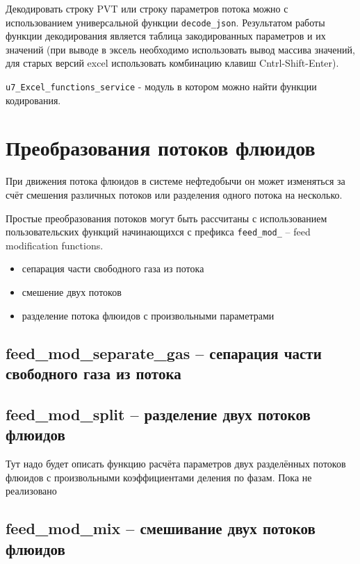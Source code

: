 Декодировать строку PVT или строку параметров потока можно с использованием универсальной функции  \texttt{decode_json}. Результатом работы функции декодирования является таблица закодированных параметров и их значений (при выводе в эксель необходимо использовать вывод массива значений, для старых версий excel использовать комбинацию клавиш Cntrl-Shift-Enter). 


\texttt{u7_Excel_functions_service} - модуль в котором можно найти функции кодирования. 

\section{Преобразования потоков флюидов}
При движения потока флюидов в системе нефтедобычи он может изменяться за счёт смешения различных потоков или разделения одного потока на несколько.

Простые преобразования потоков могут быть рассчитаны с использованием пользовательских функций \unf{} начинающихся с префикса \texttt{feed_mod_} -- feed modification functions.
\begin{itemize}
	\item сепарация части свободного газа из потока
	\item смешение двух потоков
	\item разделение потока флюидов с произвольными параметрами
\end{itemize}

\subsection{feed\_mod\_separate\_gas -- сепарация части свободного газа из потока}

 

\subsection{feed\_mod\_split -- разделение двух потоков флюидов}

Тут надо будет описать функцию расчёта параметров двух разделённых потоков флюидов с произвольными коэффициентами деления по фазам. Пока не реализовано

\subsection{feed\_mod\_mix -- смешивание двух потоков флюидов}

